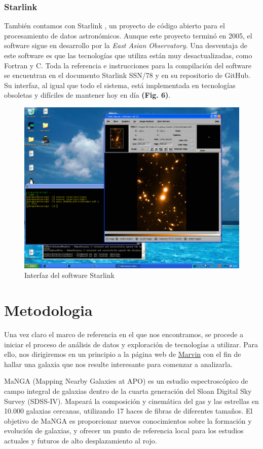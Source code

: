 \documentclass[10pt,twocolumn,a4paper]{opticajnl}
\begin{document}
\subsubsection*{Starlink}
También contamos con Starlink \cite{Berry_Starlink}, un proyecto de código abierto para el procesamiento de datos astronómicos. Aunque este proyecto terminó en 2005, el software sigue en desarrollo por la \textit{East Asian Observatory}. Una desventaja de este software es que las tecnologías que utiliza están muy desactualizadas, como Fortran y C. Toda la referencia e instrucciones para la compilación del software se encuentran en el documento Starlink SSN/78 y en su repositorio de GitHub. Su interfaz, al igual que todo el sistema, está implementada en tecnologías obsoletas y difíciles de mantener hoy en día \textbf{(Fig. 6)}.
\begin{figure}
	\centering
	\includegraphics[width=0.8\linewidth]{starlinkcap}
	\caption{Interfaz del software Starlink}
	\label{fig:starlinkcap}
\end{figure}

\section*{Metodologia}
Una vez claro el marco de referencia en el que nos encontramos, se procede a iniciar el proceso de análisis de datos y exploración de tecnologías a utilizar. Para ello, nos dirigiremos en un principio a la página web de \href{https://magrathea.sdss.org/marvin/}{Marvin} con el fin de hallar una galaxia que nos resulte interesante para comenzar a analizarla. 

MaNGA (Mapping Nearby Galaxies at APO) es un estudio espectroscópico de campo integral de galaxias dentro de la cuarta generación del Sloan Digital Sky Survey (SDSS-IV). Mapeará la composición y cinemática del gas y las estrellas en 10.000 galaxias cercanas, utilizando 17 haces de fibras de diferentes tamaños. El objetivo de MaNGA es proporcionar nuevos conocimientos sobre la formación y evolución de galaxias, y ofrecer un punto de referencia local para los estudios actuales y futuros de alto desplazamiento al rojo.
\end{document}
